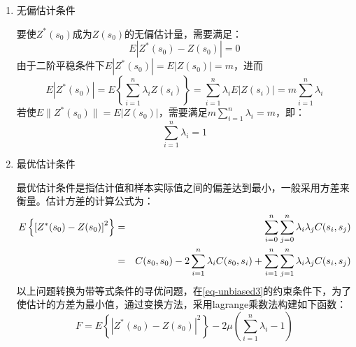 \begin{enumerate}
    \item 无偏估计条件

        要使$Z^*(s_0)$成为$Z(s_0)$的无偏估计量，需要满足：
        \begin{equation}
            E\left| Z^*(s_0)-Z(s_0) \right| = 0
            \label{eq-unbiased1}
        \end{equation}
        由于二阶平稳条件下$E| Z^*(s_0) | = E | Z(s_0) | = m$，进而
        \begin{equation}
            E | Z^*(s_0) | = E \left\{  \sum\limits_{i=1}^{n}\lambda_iZ(s_i) \right\} = \sum\limits_{i=1}^{n}\lambda_i E | Z(s_i) | = m \sum\limits_{i=1}^{n} \lambda_i
            \label{eq-unbiased2}
        \end{equation}
        若使$E\| Z^*(s_0) \| = E | Z(s_0) |$，需要满足$m\sum\limits_{i=1}^{n}\lambda_i = m$，即：
        \begin{equation}
            \sum\limits_{i=1}^{n}\lambda_i = 1
            \label{eq-unbiased3}
        \end{equation}
    \item 最优估计条件
    
        最优估计条件是指估计值和样本实际值之间的偏差达到最小，一般采用方差来衡量。估计方差的计算公式为：
        \begin{eqnarray}
        E\left\{ \left[ Z^*(s_0) - Z(s_0) \right]^2 \right\} &=& \sum\limits_{i=0}^{n}\sum\limits_{j=0}^{n}\lambda_i\lambda_jC(s_i,s_j) \notag \\
            &=& C(s_0,s_0) - 2\sum\limits_{i=1}^{n}\lambda_iC(s_0,s_i)+\sum\limits_{i=1}^{n}\sum\limits_{j=1}^{n}\lambda_i\lambda_jC(s_i,s_j)
            \label{eq-optivar}
        \end{eqnarray}
        以上问题转换为带等式条件的寻优问题，在\cref{eq-unbiased3}的约束条件下，为了使估计的方差为最小值，通过变换方法，采用lagrange乘数法构建如下函数：
        \begin{equation}
            F= E\left\{ \left| Z^*(s_0) - Z(s_0) \right|^2 \right\} - 2\mu\left( \sum\limits_{i=1}^{n} \lambda_i -1 \right)
            \label{eq-transfomredvar}
        \end{equation}
\end{enumerate}

